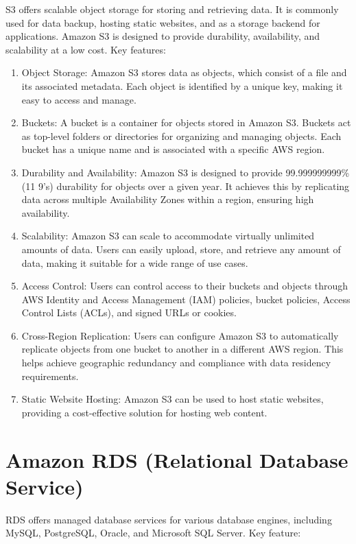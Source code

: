 \documentclass[11pt,a4paper,oneside]{report}
\begin{document}
S3 \cite{awss3} offers scalable object storage for storing and retrieving data. It is commonly used for data backup, hosting static websites, and as a storage backend for applications.
Amazon S3 is designed to provide durability, availability, and scalability at a low cost.
Key features:
\begin{enumerate}
  \item Object Storage: Amazon S3 stores data as objects, which consist of a file and its associated metadata. Each object is identified by a unique key, making it easy to access and manage.
  \item Buckets: A bucket is a container for objects stored in Amazon S3. Buckets act as top-level folders or directories for organizing and managing objects. Each bucket has a unique name and is associated with a specific AWS region.
  \item Durability and Availability: Amazon S3 is designed to provide 99.999999999\% (11 9's) durability for objects over a given year. It achieves this by replicating data across multiple Availability Zones within a region, ensuring high availability.
  \item Scalability: Amazon S3 can scale to accommodate virtually unlimited amounts of data. Users can easily upload, store, and retrieve any amount of data, making it suitable for a wide range of use cases.
  \item Access Control: Users can control access to their buckets and objects through AWS Identity and Access Management (IAM) policies, bucket policies, Access Control Lists (ACLs), and signed URLs or cookies.
  \item Cross-Region Replication: Users can configure Amazon S3 to automatically replicate objects from one bucket to another in a different AWS region. This helps achieve geographic redundancy and compliance with data residency requirements.
  \item Static Website Hosting: Amazon S3 can be used to host static websites, providing a cost-effective solution for hosting web content.
\end{enumerate}


\section{Amazon RDS (Relational Database Service)}

RDS \cite{awsrds} offers managed database services for various database engines, including MySQL, PostgreSQL, Oracle, and Microsoft SQL Server.
Key feature:
\end{document}
